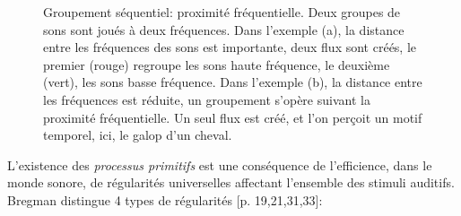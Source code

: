 \begin{figure}[t]
        \myfloatalign
        \caption[Groupement séquentiel: proximité fréquentielle.]{Groupement séquentiel: proximité fréquentielle. Deux groupes de sons sont joués à deux fréquences. Dans l'exemple (a), la distance entre les fréquences des sons est importante, deux flux sont créés, le premier (rouge) regroupe les sons haute fréquence, le deuxième (vert), les sons basse fréquence. Dans l'exemple (b), la distance entre les fréquences est réduite, un groupement s'opère suivant la proximité fréquentielle. Un seul flux est créé, et l'on perçoit un motif temporel, ici, le galop d'un cheval.}\label{fig:galop}
\end{figure}

L'existence des \emph{processus primitifs} est une conséquence de l'efficience, dans le monde sonore, de régularités universelles affectant l'ensemble des stimuli auditifs. Bregman distingue 4 types de régularités [p. 19,21,31,33]\citep{mcadams1994penser}:

